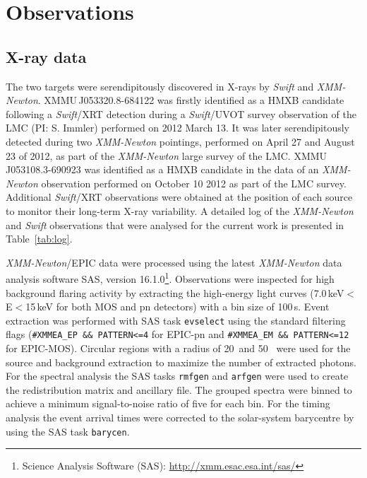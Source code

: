 \documentclass[a4paper,fleqn,usenatbib]{mnras}
\newcommand{\swift}{{\it Swift}\xspace}
\newcommand{\xmm}{{\it XMM-Newton}\xspace}
\newcommand{\canda}{XMMU\,J053108.3-690923\xspace} %
\newcommand{\candb}{XMMU\,J053320.8-684122\xspace} %
\begin{document}
\section{Observations}
\label{sec-observations}


\subsection{X-ray data}
The two targets were serendipitously discovered in X-rays by \swift and \xmm.
\candb was firstly identified as a HMXB candidate following a \swift/XRT detection \citep[Swift\,J053321.3-684121:][]{2012ATel.3993....1S} during a \swift/UVOT survey observation of the LMC (PI: S. Immler) performed on 2012 March 13. It was later serendipitously detected during two \xmm pointings, performed on April 27 and August 23 of 2012, as part of the \xmm large survey of the LMC.  \canda was identified as a HMXB candidate in the data of an \xmm observation performed on October 10 2012 as part of the LMC survey. Additional \swift/XRT observations were obtained at the position of each source to monitor their long-term X-ray variability. A detailed log of the \xmm and \swift observations that were analysed for the current work is presented in Table~\ref{tab:log}.

\xmm/EPIC \citep{2001A&A...365L..18S,2001A&A...365L..27T} data were processed using the latest \xmm data analysis software SAS, version 16.1.0\footnote{Science Analysis Software (SAS): \url{http://xmm.esac.esa.int/sas/}}. Observations were inspected for high background flaring activity by extracting the high-energy light curves (7.0\,keV$<$E$<$15\,keV for both MOS and pn detectors) with a bin size of 100\,s. Event extraction was performed with SAS task \texttt{evselect} using the standard filtering flags (\texttt{\#XMMEA\_EP \&\& PATTERN<=4} for EPIC-pn and \texttt{\#XMMEA\_EM \&\& PATTERN<=12} for EPIC-MOS).
Circular regions with a radius of 20\arcsec~and 50\arcsec~ were used for the source and background extraction to maximize the number of extracted photons.
For the spectral analysis the SAS tasks \texttt{rmfgen} and \texttt{arfgen} were used to create the redistribution matrix and ancillary file.
The grouped spectra were binned to achieve a minimum signal-to-noise ratio of five for each bin.
For the timing analysis the event arrival times were corrected to the solar-system barycentre by using the SAS task {\tt barycen}. 
\end{document}
